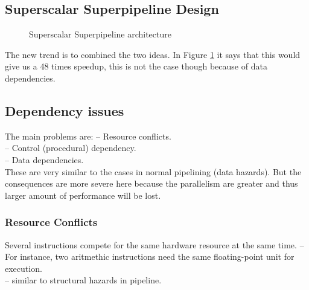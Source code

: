 \documentclass[titlepage, a4paper]{article}
\begin{document}
\subsection{Superscalar Superpipeline Design}

\begin{figure}[H]
  \centering
  \caption{Superscalar Superpipeline architecture}
  \label{fig:superscalar-superpipeline}
\end{figure}

The new trend is to combined the two ideas. In Figure \ref{fig:superscalar-superpipeline} it says that this would give us a 48 times speedup, this is not the case though because of data dependencies.

\subsection{Dependency issues}
The main problems are:
-- Resource conflicts. \\
-- Control (procedural) dependency. \\
-- Data dependencies. \\

These are very similar to the cases in normal pipelining (data hazards). But the consequences are more severe here because the parallelism are greater and thus larger amount of performance will be lost. \\

\subsubsection{Resource Conflicts}
Several instructions compete for the same hardware resource at the same time.
-- For instance, two aritmethic instructions need the same floating-point unit for execution. \\
-- similar to structural hazards in pipeline. \\
\end{document}
